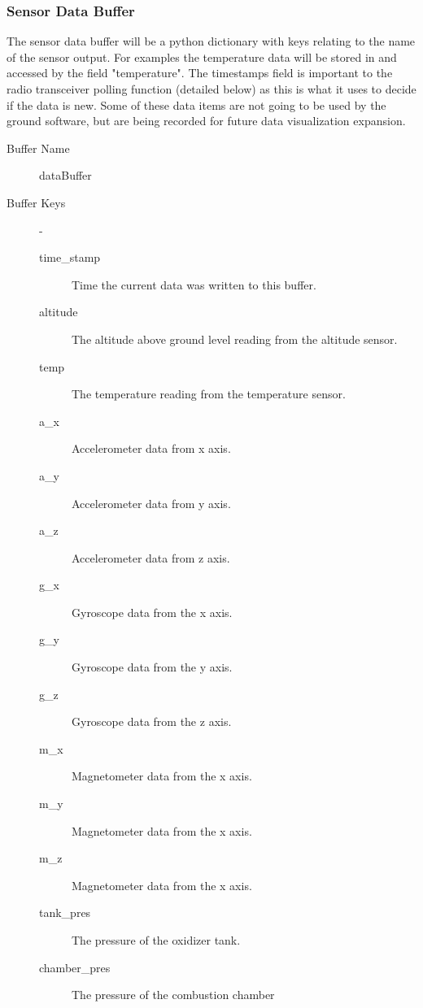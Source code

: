 \documentclass[10pt,draftclsnofoot,onecolumn,retainorgcmds]{IEEEtran}
\begin{document}
\subsubsection{Sensor Data Buffer}
The sensor data buffer will be a python dictionary with keys relating to the name of the sensor output. For examples the temperature data will be stored in and accessed by the field "temperature".  The timestamps field is important to the radio transceiver polling function (detailed below) as this is what it uses to decide if the data is new. Some of these data items are not going to be used by the ground software, but are being recorded for future data visualization expansion.
\begin{description}
	\item[Buffer Name] dataBuffer
	\item[Buffer Keys]  -
	\begin{description}
		\item[time\_stamp] Time the current data was written to this buffer.
		\item[altitude] The altitude above ground level reading from the altitude sensor.
		\item[temp] The temperature reading from the temperature sensor.
		\item[a\_x] Accelerometer data from x axis.
		\item[a\_y] Accelerometer data from y axis.
		\item[a\_z] Accelerometer data from z axis.
		\item[g\_x] Gyroscope data from the x axis.
		\item[g\_y] Gyroscope data from the y axis.
		\item[g\_z] Gyroscope data from the z axis.
		\item[m\_x] Magnetometer data from the x axis.
		\item[m\_y] Magnetometer data from the x axis.
		\item[m\_z] Magnetometer data from the x axis.
		\item[tank\_pres] The pressure of the oxidizer tank.
		\item[chamber\_pres] The pressure of the combustion chamber
	\end{description}
\end{description}
\end{document}
